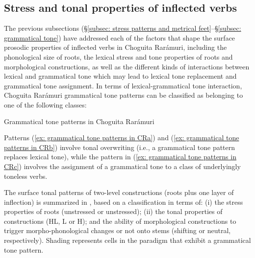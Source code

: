 \subsection{Stress and tonal properties of inflected verbs}
\label{subsec: stress and tonal properties of inflected verbs}

The previous subsections (§\ref{subsec: stress patterns and metrical feet}--§\ref{subsec: grammatical tone}) have addressed each of the factors that shape the surface prosodic properties of inflected verbs in Choguita Rarámuri, including the phonological size of roots, the lexical stress and tone properties of roots and morphological constructions, as well as the different kinds of interactions between lexical and grammatical tone which may lead to lexical tone replacement and grammatical tone assignment. In terms of lexical-grammatical tone interaction, Choguita Rarámuri grammatical tone patterns can be classified as belonging to one of the following classes:

\ea\label{ex: grammatical tone patterns in CR}
{Grammatical tone patterns in Choguita Rarámuri}\mbox{}

    \label{ex: grammatical tone patterns in CRa}
        \label{ex: grammatical tone patterns in CRb}
            \label{ex: grammatical tone patterns in CRc}
    \z
\z

Patterns (\ref{ex: grammatical tone patterns in CRa}) and (\ref{ex: grammatical tone patterns in CRb}) involve tonal overwriting (i.e., a grammatical tone pattern replaces lexical tone), while the pattern in (\ref{ex: grammatical tone patterns in CRc}) involves the assignment of a grammatical tone to a class of underlyingly toneless verbs.

The surface tonal patterns of two-level constructions (roots plus one layer of inflection) is summarized in , based on a classification in terms of: (i) the stress properties of roots (unstressed or unstressed); (ii) the tonal properties of constructions (HL, L or H); and the ability of morphological constructions to trigger morpho-phonological changes or not onto stems (shifting or neutral, respectively). Shading represents cells in the paradigm that exhibit a grammatical tone pattern.

